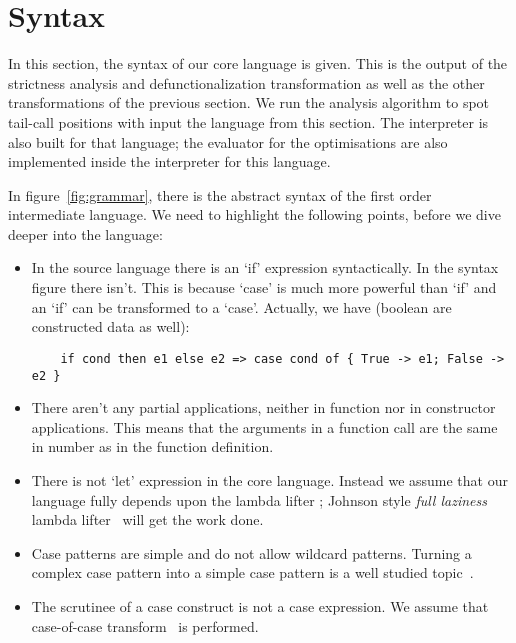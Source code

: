 \documentclass[diploma]{softlab-thesis}
\begin{document}
\section{Syntax}
\label{sec:syntax}

In this section, the syntax of our core language is given.
This is the output of the strictness analysis and 
defunctionalization transformation as well as the other transformations of the previous 
section. We run the analysis algorithm to spot tail-call positions with input 
the language from this section. The interpreter is also built for that language; the evaluator for 
the optimisations are also implemented inside the interpreter for this language.
\newline
\par In figure~\ref{fig:grammar}, there is the abstract syntax of 
the first order intermediate language.
We need to highlight the following points, before we dive deeper into the language:
\begin{itemize}
  \item In the source language there is an `if' expression syntactically. In the syntax figure there isn't.
  This is because `case' is much more powerful than `if' and an `if' can be transformed to a `case'. 
  Actually, we have (boolean are constructed data as well):
  \begin{verbatim}
    if cond then e1 else e2 => case cond of { True -> e1; False -> e2 }
  \end{verbatim}
  \item There aren't any partial applications, neither in function nor in constructor applications.
  This means that the arguments in a function call are the same in number as in the function definition.
  \item There is not `let' expression in the core language. Instead we assume that our language 
  fully depends upon the lambda lifter ; Johnson style \textit{full laziness} lambda lifter~\cite{Johnsson:1985:LLT:5280.5292}
  will get the work done.
  \item Case patterns are simple and do not allow wildcard patterns. Turning a complex case pattern into
  a simple case pattern is a well studied topic~\cite{Au85,Wadler87}.
  \item The scrutinee of a case construct is not a case expression. We assume that case-of-case 
  transform~\cite{Jone98} is performed.
\end{itemize}
\end{document}
